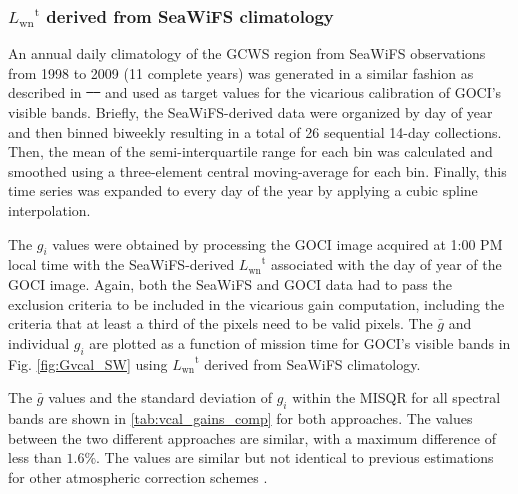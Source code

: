 \documentclass[]{interact}
\theoremstyle{plain}%
\theoremstyle{definition}
\theoremstyle{remark}
\providecommand{\DIFaddtex}[1]{{\protect\color{blue}\uwave{#1}}} %
\providecommand{\DIFdeltex}[1]{{\protect\color{red}\sout{#1}}}                      %
\providecommand{\DIFaddbegin}{} %
\providecommand{\DIFaddend}{} %
\providecommand{\DIFdelbegin}{} %
\providecommand{\DIFdelend}{} %
\providecommand{\DIFadd}[1]{\texorpdfstring{\DIFaddtex{#1}}{#1}} %
\providecommand{\DIFdel}[1]{\texorpdfstring{\DIFdeltex{#1}}{}} %
\newcommand{\DIFscaledelfig}{0.5}
\newlength{\DIFdelgraphicswidth} %
\newlength{\DIFdelgraphicsheight} %
\newcommand{\DIFaddincludegraphics}[2][]{{\color{blue}\fbox{\DIFOincludegraphics[#1]{#2}}}} %
\newcommand{\DIFdelincludegraphics}[2][]{%
\sbox{\DIFdelgraphicsbox}{\DIFOincludegraphics[#1]{#2}}%
\settoboxwidth{\DIFdelgraphicswidth}{\DIFdelgraphicsbox} %
\settoboxtotalheight{\DIFdelgraphicsheight}{\DIFdelgraphicsbox} %
\scalebox{\DIFscaledelfig}{%
\parbox[b]{\DIFdelgraphicswidth}{\usebox{\DIFdelgraphicsbox}\\[-\baselineskip] \rule{\DIFdelgraphicswidth}{0em}}\llap{\resizebox{\DIFdelgraphicswidth}{\DIFdelgraphicsheight}{%
\setlength{\unitlength}{\DIFdelgraphicswidth}%
\begin{picture}(1,1)%
\thicklines\linethickness{2pt} %
{\color[rgb]{1,0,0}\put(0,0){\framebox(1,1){}}}%
{\color[rgb]{1,0,0}\put(0,0){\line( 1,1){1}}}%
{\color[rgb]{1,0,0}\put(0,1){\line(1,-1){1}}}%
\end{picture}%
}\hspace*{3pt}}} %
} %
\DeclareRobustCommand{\DIFaddbegin}{\DIFOaddbegin \let\includegraphics\DIFaddincludegraphics} %
\DeclareRobustCommand{\DIFaddend}{\DIFOaddend \let\includegraphics\DIFOincludegraphics} %
\DeclareRobustCommand{\DIFdelbegin}{\DIFOdelbegin \let\includegraphics\DIFdelincludegraphics} %
\DeclareRobustCommand{\DIFdelend}{\DIFOaddend \let\includegraphics\DIFOincludegraphics} %
\begin{document}
\subsubsection{${L_\text{wn}}^\text{t}$ derived from SeaWiFS climatology}
An annual daily climatology of the GCWS region from SeaWiFS observations from 1998 to 2009 (11 complete years) was generated in a similar fashion as described in \DIFdelbegin \DIFdel{\mbox{%
\citep{Werdell:07} }%
}\DIFdelend \DIFaddbegin \DIFadd{\mbox{%
\cite{Werdell:07} }%
}\DIFaddend and used as target values for the vicarious calibration of GOCI's visible bands. Briefly, the SeaWiFS-derived data were organized by day of year and then binned biweekly resulting in a total of 26 sequential 14-day collections. Then, the mean of the semi-interquartile range for each bin was calculated and smoothed using a three-element central moving-average for each bin. Finally, this time series was expanded to every day of the year by applying a cubic spline interpolation. 

The $g_i$ values were obtained by processing the GOCI image acquired at 1:00 PM local time with the SeaWiFS-derived ${L_\text{wn}}^\text{t}$ associated with the day of year of the GOCI image. Again, both the SeaWiFS and GOCI data had to pass the exclusion criteria to be included in the vicarious gain computation, including the criteria that at least a third of the pixels need to be valid pixels. The $\bar{g}$ and individual $g_i$ are plotted as a function of mission time for GOCI's visible bands in Fig. \ref{fig:Gvcal_SW} using ${L_\text{wn}}^\text{t}$ derived from SeaWiFS climatology.

The $\bar{g}$ values and the standard deviation of $g_i$ within the MISQR for all spectral bands are shown in \autoref{tab:vcal_gains_comp} for both approaches. The values between the two different approaches are similar, with a maximum difference of less than $1.6\%$. The values are similar but not identical to previous estimations for other atmospheric correction schemes \citep{Wang:13,Ahn2015}. 
\end{document}
